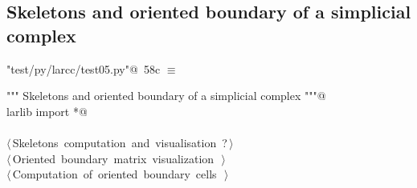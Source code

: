 \documentclass[11pt,oneside]{article}	%
\begin{document}
\subsection{Skeletons and oriented boundary of a simplicial complex}


\begin{flushleft} \small
\begin{minipage}{\linewidth} \label{scrap109}
\protect{}\verb@"test/py/larcc/test05.py"@\nobreak\ {\footnotesize 58c }$\equiv$
\vspace{-1ex}
\begin{list}{}{} \item
\mbox{}\verb@""" Skeletons and oriented boundary of a simplicial complex """@\\
\mbox{}\verb@from larlib import *@\\
\mbox{}\verb@@\\
\mbox{}\verb@@\hbox{$\langle\,$Skeletons computation and visualisation\nobreak\ {\footnotesize ?}$\,\rangle$}\verb@@\\
\mbox{}\verb@@\hbox{$\langle\,$Oriented boundary matrix visualization\nobreak\ {\footnotesize {}}$\,\rangle$}\verb@@\\
\mbox{}\verb@@\hbox{$\langle\,$Computation of oriented boundary cells\nobreak\ {\footnotesize {}}$\,\rangle$}\verb@@\\
\mbox{}\verb@@{\NWsep}
\end{list}
\vspace{-2ex}
\end{minipage}\\[4ex]
\end{flushleft}
\end{document}
